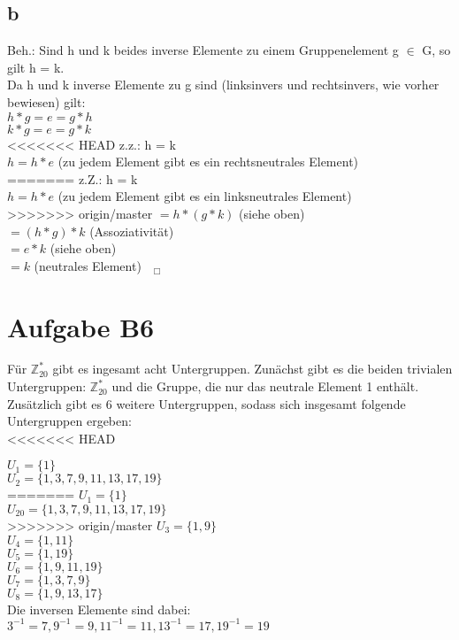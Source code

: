 \documentclass[11pt,a4paper]{article}
\begin{document}
\subsection*{b}
Beh.: Sind h und k beides inverse Elemente zu einem Gruppenelement g $\in$ G, so gilt h = k. \\

Da h und k inverse Elemente zu g sind (linksinvers und rechtsinvers, wie vorher bewiesen) gilt: \\
$ h \ast  g = e = g \ast  h$ \\
$ k \ast  g = e = g \ast  k$  \\

<<<<<<< HEAD
z.z.: h = k \\
$h = h \ast e$   (zu jedem Element gibt es ein rechtsneutrales Element) \\
=======
z.Z.: h = k \\
$h = h \ast e$   (zu jedem Element gibt es ein linksneutrales Element) \\
>>>>>>> origin/master
$= h \ast (g \ast k)$    (siehe oben) \\
$= (h \ast g) \ast k$    (Assoziativität) \\
$= e \ast k$      (siehe oben) \\
$=k$       (neutrales Element) $~~~_\Box$ \\

\section*{Aufgabe B6}
Für $\mathbb{Z}^{*}_{20}$ gibt es ingesamt acht Untergruppen. Zunächst gibt es die beiden trivialen Untergruppen:  $\mathbb{Z}^{*}_{20}$ und die Gruppe, die nur das neutrale Element 1 enthält. Zusätzlich gibt es 6 weitere Untergruppen, sodass sich insgesamt folgende Untergruppen ergeben: \\
<<<<<<< HEAD

$U_1 =\{1\}$ \\
$U_2 = \{1,3,7,9,11,13,17,19\}$\\
=======
$U_1 =\{1\}$\\
$U_{20} = \{1,3,7,9,11,13,17,19\}$\\
>>>>>>> origin/master
$U_3=\{1,9\}$\\
$U_4=\{1,11\}$\\
$U_5=\{1,19\}$\\
$U_6=\{1,9,11,19\}$\\
$U_7=\{1,3,7,9\}$\\
$U_8=\{1,9,13,17\}$\\

Die inversen Elemente sind dabei: \\
$3^{-1}=7, 9^{-1}=9, 11^{-1}=11, 13^{-1}=17, 19^{-1}=19$\\
\end{document}
